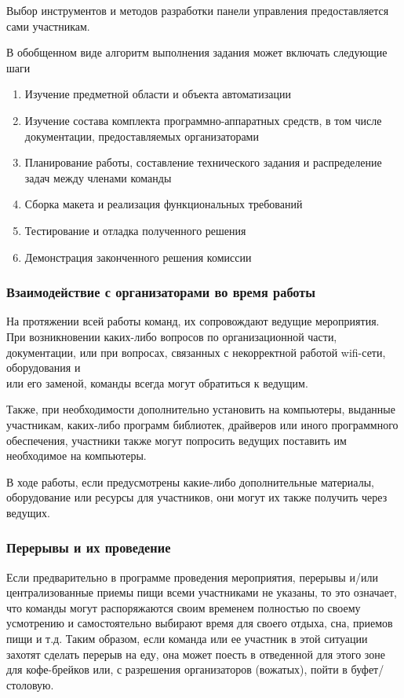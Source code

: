 Выбор инструментов и методов разработки панели управления предоставляется сами участникам.

В обобщенном виде алгоритм выполнения задания может включать следующие шаги

\begin{enumerate}
    \item Изучение предметной области и объекта автоматизации
    \item Изучение состава комплекта программно-аппаратных средств, в том числе документации, предоставляемых организаторами
    \item Планирование работы, составление технического задания и распределение задач между членами команды
    \item Сборка макета и реализация функциональных требований
    \item Тестирование и отладка полученного решения
    \item Демонстрация законченного решения комиссии
\end{enumerate}

\subsubsection*{Взаимодействие с организаторами во время работы}

На протяжении всей работы команд, их сопровождают ведущие мероприятия. При возникновении каких-либо вопросов по организационной части, документации, или при вопросах, связанных с некорректной работой wifi-сети, оборудования и\\или его заменой, команды всегда могут обратиться к ведущим.

Также, при необходимости дополнительно установить на компьютеры, выданные участникам, каких-либо программ библиотек, драйверов или иного программного обеспечения, участники также могут попросить ведущих поставить им необходимое на компьютеры.

В ходе работы, если предусмотрены какие-либо дополнительные материалы, оборудование или ресурсы для участников, они могут их также получить через ведущих.

\subsubsection*{Перерывы и их проведение}

Если предварительно в программе проведения мероприятия, перерывы и/или централизованные приемы пищи всеми участниками не указаны, то это означает, что команды могут распоряжаются своим временем полностью по своему усмотрению и самостоятельно выбирают время для своего отдыха, сна, приемов пищи и т.д. Таким образом, если команда или ее участник в этой ситуации захотят сделать перерыв на еду, она может поесть в отведенной для этого зоне для кофе-брейков или, с разрешения организаторов (вожатых), пойти в буфет/столовую.

